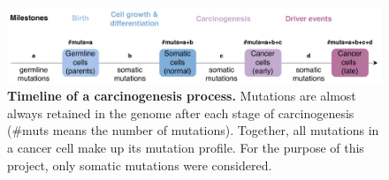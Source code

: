 \begin{figure}[htbp!]
    \centering
    \includegraphics[scale=0.78]{graphics/drivers_demo.pdf}
    \caption{\textbf{Timeline of a carcinogenesis process.} Mutations are almost always retained in the genome after each stage of carcinogenesis (\#muts means the number of mutations). Together, all mutations in a cancer cell make up its mutation profile. For the purpose of this project, only somatic mutations were considered.}
    \label{fig:drivers_demo}
\end{figure}

